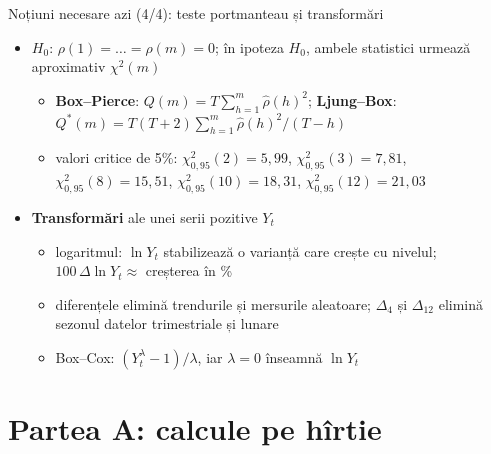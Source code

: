 \begin{frame}{Noțiuni necesare azi (4/4): teste portmanteau și transformări}
\itemsize{\small}
\begin{itemize}
    \item $H_0$: $\rho(1) = \dots = \rho(m) = 0$; în ipoteza $H_0$, ambele statistici urmează aproximativ $\chi^2(m)$
    \begin{itemize}
        \item \textbf{Box--Pierce}: $Q(m) = T\sum_{h=1}^{m}\hat\rho(h)^2$; \textbf{Ljung--Box}: $Q^*(m) = T(T + 2)\sum_{h=1}^{m}\hat\rho(h)^2/(T - h)$
        \item valori critice de 5\%: $\chi^2_{0{,}95}(2) = 5{,}99$, $\chi^2_{0{,}95}(3) = 7{,}81$, $\chi^2_{0{,}95}(8) = 15{,}51$, $\chi^2_{0{,}95}(10) = 18{,}31$, $\chi^2_{0{,}95}(12) = 21{,}03$
    \end{itemize}
    \item \textbf{Transformări} ale unei serii pozitive $Y_t$
    \begin{itemize}
        \item logaritmul: $\ln Y_t$ stabilizează o varianță care crește cu nivelul; $100\,\Delta\ln Y_t \approx$ creșterea în \%
        \item diferențele elimină trendurile și mersurile aleatoare; $\Delta_4$ și $\Delta_{12}$ elimină sezonul datelor trimestriale și lunare
        \item Box--Cox: $(Y_t^\lambda - 1)/\lambda$, iar $\lambda = 0$ înseamnă $\ln Y_t$
    \end{itemize}
\end{itemize}
\end{frame}


\section{Partea A: calcule pe hîrtie}

